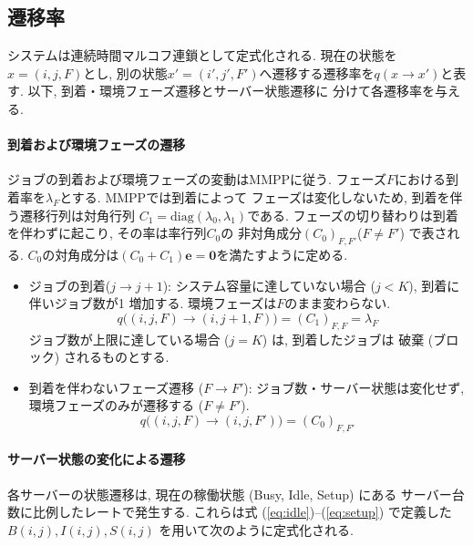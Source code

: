 \documentclass[a4paper, 11pt, dvipdfmx]{jsreport}
\begin{document}
\subsection{遷移率}
\label{sec:transition-rates}
システムは連続時間マルコフ連鎖として定式化される. 現在の状態を$x=(i, j, F)$とし, 別の状態$x'=(i', j', F')$へ遷移する遷移率を$q(x\to x')$と表す. 以下, 到着・環境フェーズ遷移とサーバー状態遷移に
分けて各遷移率を与える. 

\paragraph{到着および環境フェーズの遷移}
\label{sec:arrival-transition}

ジョブの到着および環境フェーズの変動はMMPPに従う. フェーズ$F$における到着率を$\lambda_F$とする. 
MMPPでは到着によって
フェーズは変化しないため, 到着を伴う遷移行列は対角行列
$C_1=\mathrm{diag}(\lambda_0, \lambda_1)$である. 
フェーズの切り替わりは到着を伴わずに起こり, その率は率行列$C_0$の
非対角成分$(C_0)_{F, F'}$($F\neq F'$) で表される. 
$C_0$の対角成分は$(C_0+C_1)\bm{e}= \bm{0}$を満たすように定める. 

\begin{itemize}
    \item ジョブの到着($j\to j+1$):
    システム容量に達していない場合 ($j < K$), 到着に伴いジョブ数が1
    増加する. 環境フェーズは$F$のまま変わらない. 
    \[ q\big((i, j, F) \to (i, j+1, F)\big) = (C_1)_{F, F} = \lambda_F \]
    ジョブ数が上限に達している場合 ($j = K$) は, 到着したジョブは
    破棄 (ブロック) されるものとする. 

    \item 到着を伴わないフェーズ遷移 ($F \to F'$):
    ジョブ数・サーバー状態は変化せず, 環境フェーズのみが遷移する
    ($F \neq F'$). 
    \[ q\big((i, j, F) \to (i, j, F')\big) = (C_0)_{F, F'} \]
\end{itemize}

\paragraph{サーバー状態の変化による遷移}
\label{sec:server-transition}

各サーバーの状態遷移は, 現在の稼働状態 (Busy, Idle, Setup) にある
サーバー台数に比例したレートで発生する. これらは式
(\ref{eq:idle})–(\ref{eq:setup}) で定義した$B(i, j), I(i, j), S(i, j)$
を用いて次のように定式化される. 
\end{document}
